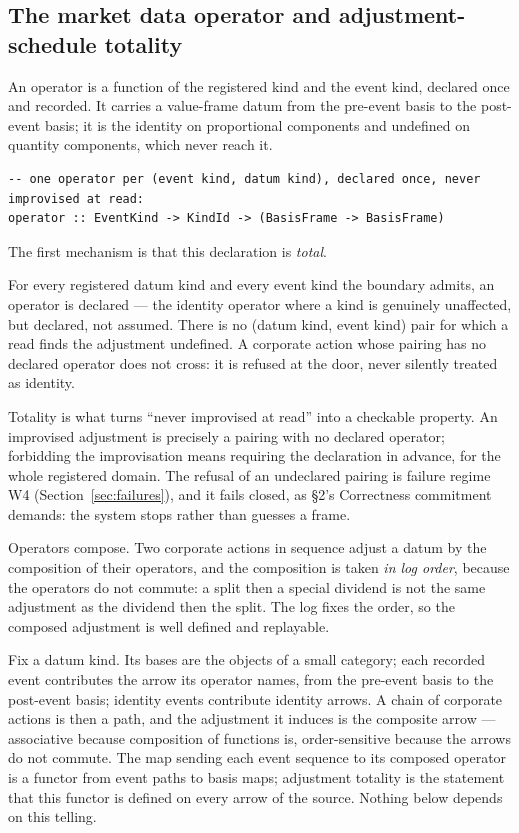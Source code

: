 \subsection{The market data operator and adjustment-schedule totality}\label{sec:operator}

An operator is a function of the registered kind and the event kind, declared once and
recorded. It carries a value-frame datum from the pre-event basis to the post-event basis;
it is the identity on proportional components and undefined on quantity components, which
never reach it.

\begin{lstlisting}
-- one operator per (event kind, datum kind), declared once, never improvised at read:
operator :: EventKind -> KindId -> (BasisFrame -> BasisFrame)
\end{lstlisting}

The first mechanism is that this declaration is \emph{total}.

\begin{principle}\label{prin:sched-total}
For every registered datum kind and every event kind the boundary admits, an operator is
declared --- the identity operator where a kind is genuinely unaffected, but declared, not
assumed. There is no (datum kind, event kind) pair for which a read finds the adjustment
undefined. A corporate action whose pairing has no declared operator does not cross: it is
refused at the door, never silently treated as identity.
\end{principle}

Totality is what turns ``never improvised at read'' into a checkable property. An
improvised adjustment is precisely a pairing with no declared operator; forbidding the
improvisation means requiring the declaration in advance, for the whole registered domain.
The refusal of an undeclared pairing is failure regime W4 (Section~\ref{sec:failures}), and
it fails closed, as \S 2's Correctness commitment demands: the system stops rather than
guesses a frame.

Operators compose. Two corporate actions in sequence adjust a datum by the composition of
their operators, and the composition is taken \emph{in log order}, because the operators do
not commute: a split then a special dividend is not the same adjustment as the dividend
then the split. The log fixes the order, so the composed adjustment is well defined and
replayable.

\begin{secondtelling}
Fix a datum kind. Its bases are the objects of a small category; each recorded event
contributes the arrow its operator names, from the pre-event basis to the post-event basis;
identity events contribute identity arrows. A chain of corporate actions is then a path, and
the adjustment it induces is the composite arrow --- associative because composition of
functions is, order-sensitive because the arrows do not commute. The map sending each event
sequence to its composed operator is a functor from event paths to basis maps; adjustment
totality is the statement that this functor is defined on every arrow of the source. Nothing
below depends on this telling.
\end{secondtelling}

